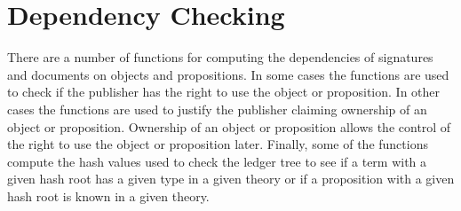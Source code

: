 \section{Dependency Checking}

There are a number of functions for computing the dependencies
of signatures and documents on objects and propositions.
In some cases the functions are used to check if the publisher has the
right to use the object or proposition.
In other cases the functions are used to justify the publisher claiming
ownership of an object or proposition.
Ownership of an object or proposition allows the control of the right to use
the object or proposition later.
Finally, some of the functions compute the hash values used to check the ledger
tree to see if a term with a given hash root has a given type in a given theory
or if a proposition with a given hash root is known in a given theory.

